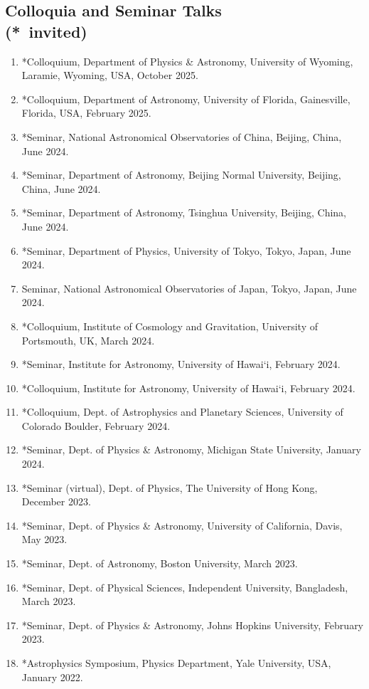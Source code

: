 \documentclass[margin, line]{res}
\begin{document}
\begin{resume}
\section{\sc Colloquia and Seminar Talks\\ ({*}\ invited)}
\begin{enumerate}
	\item *Colloquium, Department of Physics \& Astronomy, University of Wyoming, Laramie, Wyoming, USA, October 2025.
	\item *Colloquium, Department of Astronomy, University of Florida, Gainesville, Florida, USA, February 2025.
	\item *Seminar, National Astronomical Observatories of China, Beijing, China, June 2024.
	\item *Seminar, Department of Astronomy, Beijing Normal University, Beijing, China, June 2024.
	\item *Seminar, Department of Astronomy, Tsinghua University, Beijing, China, June 2024.
	\item *Seminar, Department of Physics, University of Tokyo, Tokyo, Japan, June 2024.
	\item Seminar, National Astronomical Observatories of Japan, Tokyo, Japan, June 2024.
	\item *Colloquium, Institute of Cosmology and Gravitation, University of Portsmouth, UK, March 2024.
	\item *Seminar, Institute for Astronomy, University of Hawai`i, February 2024. 
	\item *Colloquium, Institute for Astronomy, University of Hawai`i, February 2024. 
	\item *Colloquium, Dept. of Astrophysics and Planetary Sciences, University of Colorado Boulder, February 2024.
	\item *Seminar, Dept. of Physics \& Astronomy, Michigan State University, January 2024.
	\item *Seminar (virtual), Dept. of Physics, The University of Hong Kong, December 2023.
	\item *Seminar, Dept. of Physics \& Astronomy, University of California, Davis, May 2023.
	\item *Seminar, Dept. of Astronomy, Boston University, March 2023.
	\item *Seminar, Dept. of Physical Sciences, Independent University, Bangladesh, March 2023.
	\item {*}Seminar, Dept. of Physics \& Astronomy, Johns Hopkins University, February 2023.
	\item {*}Astrophysics Symposium, Physics Department, Yale University, USA, January 2022.

\end{enumerate}
\end{resume}
\end{document}
